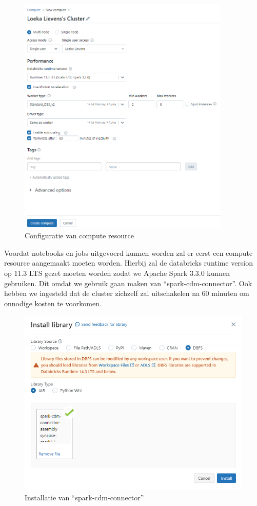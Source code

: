 \begin{figure}[H]
    \centering
    \includegraphics[width=0.9\textwidth]{./graphics/databricks/initial_5.png}
    \caption{Configuratie van compute resource}
\end{figure}

Voordat notebooks en jobs uitgevoerd kunnen worden zal er eerst een compute resource aangemaakt moeten worden. Hierbij zal de databricks runtime version op 11.3 LTS gezet moeten worden zodat we Apache Spark 3.3.0 kunnen gebruiken. Dit omdat we gebruik gaan maken van ``spark-cdm-connector''. Ook hebben we ingesteld dat de cluster zichzelf zal uitschakelen na 60 minuten om onnodige kosten te voorkomen.

\begin{figure}[H]
    \centering
    \includegraphics[width=1\textwidth]{./graphics/databricks/initial_6.png}
    \caption{Installatie van ``spark-cdm-connector''}
\end{figure}

